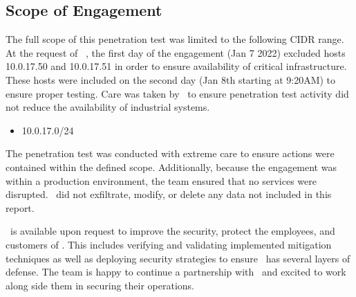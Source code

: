 \subsection{Scope of Engagement}
    The full scope of this penetration test was limited to the following CIDR range.  At the request of \cptc\ , the first day of the engagement (Jan 7 2022) excluded hosts 10.0.17.50 and 10.0.17.51 in order to ensure availability of critical infrastructure.  These hosts were included on the second day (Jan 8th starting at 9:20AM) to ensure proper testing.  Care was taken by \teamname\ to ensure penetration test activity did not reduce the availability of industrial systems.
    
    \begin{itemize}
        \item 10.0.17.0/24 
    \end{itemize}

    The penetration test was conducted with extreme care to ensure actions were contained within the defined scope. Additionally, because the engagement was within a production environment, the team ensured that no services were disrupted. \teamname\ did not exfiltrate, modify, or delete any data not included in this report. 

    \teamname\ is available upon request to improve the security, protect the employees, and customers of \cptc. This includes verifying and validating implemented mitigation techniques as well as deploying security strategies to ensure \cptc\ has several layers of defense. The team is happy to continue a partnership with \cptc\ and excited to work along side them in securing their operations. 